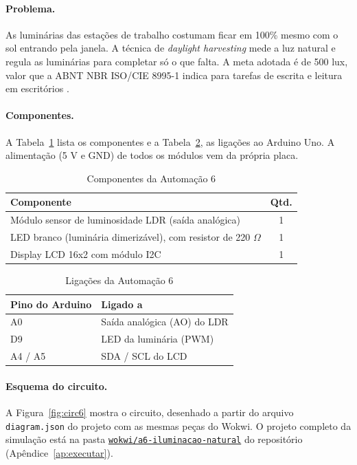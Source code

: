 \documentclass[12pt]{article}
\newcommand{\repositorio}{https://github.com/santanathalles76-tech/Trabalho-sistemas-embarcadosA2}
\newcommand{\simlink}[1]{\href{\repositorio/tree/main/wokwi/#1}{\texttt{wokwi/#1}}}
\begin{document}
\paragraph{Problema.} As luminárias das estações de trabalho costumam ficar em 100\% mesmo com o sol entrando pela janela. A técnica de \emph{daylight harvesting} mede a luz natural e regula as luminárias para completar só o que falta. A meta adotada é de 500 lux, valor que a ABNT NBR ISO/CIE 8995-1 indica para tarefas de escrita e leitura em escritórios \cite{abnt8995}.

\paragraph{Componentes.} A Tabela~\ref{tab:comp6} lista os componentes e a Tabela~\ref{tab:lig6}, as ligações ao Arduino Uno. A alimentação (5 V e GND) de todos os módulos vem da própria placa.

\begin{table}[!htb]
\centering
\caption{Componentes da Automação 6}\label{tab:comp6}
\small
\begin{tabularx}{\textwidth}{Xc}
\toprule
Componente & Qtd. \\
\midrule
Módulo sensor de luminosidade LDR (saída analógica) & 1 \\
LED branco (luminária dimerizável), com resistor de 220 $\Omega$ & 1 \\
Display LCD 16x2 com módulo I2C & 1 \\
\bottomrule
\end{tabularx}
\end{table}

\begin{table}[!htb]
\centering
\caption{Ligações da Automação 6}\label{tab:lig6}
\small
\begin{tabularx}{\textwidth}{lX}
\toprule
Pino do Arduino & Ligado a \\
\midrule
A0 & Saída analógica (AO) do LDR \\
D9 & LED da luminária (PWM) \\
A4 / A5 & SDA / SCL do LCD \\
\bottomrule
\end{tabularx}
\end{table}

\paragraph{Esquema do circuito.} A Figura~\ref{fig:circ6} mostra o circuito, desenhado a partir do arquivo \texttt{diagram.json} do projeto com as mesmas peças do Wokwi. O projeto completo da simulação está na pasta \simlink{a6-iluminacao-natural} do repositório (Apêndice~\ref{ap:executar}).
\end{document}
